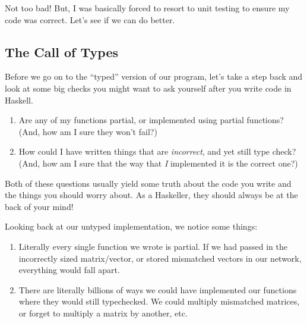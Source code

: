 \documentclass[]{article}
\begin{document}
Not too bad! But, I was basically forced to resort to unit testing to
ensure my code was correct. Let's see if we can do better.

\subsection{The Call of Types}\label{the-call-of-types}

Before we go on to the ``typed'' version of our program, let's take a
step back and look at some big checks you might want to ask yourself
after you write code in Haskell.

\begin{enumerate}
\def\labelenumi{\arabic{enumi}.}
\tightlist
\item
  Are any of my functions partial, or implemented using partial
  functions? (And, how am I sure they won't fail?)
\item
  How could I have written things that are \emph{incorrect}, and yet
  still type check? (And, how am I sure that the way that \emph{I}
  implemented it is the correct one?)
\end{enumerate}

Both of these questions usually yield some truth about the code you
write and the things you should worry about. As a Haskeller, they should
always be at the back of your mind!

Looking back at our untyped implementation, we notice some things:

\begin{enumerate}
\def\labelenumi{\arabic{enumi}.}
\tightlist
\item
  Literally every single function we wrote is partial. If we had passed
  in the incorrectly sized matrix/vector, or stored mismatched vectors
  in our network, everything would fall apart.
\item
  There are literally billions of ways we could have implemented our
  functions where they would still typechecked. We could multiply
  mismatched matrices, or forget to multiply a matrix by another, etc.
\end{enumerate}
\end{document}
